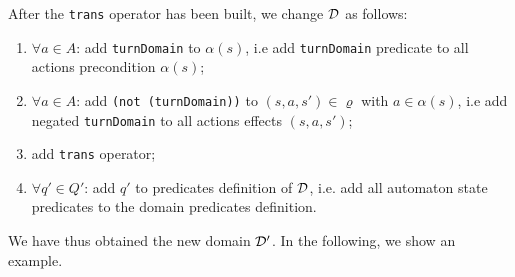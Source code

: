 After the \texttt{trans} operator has been built, we change $\mathcal{D}$ as follows:
\begin{enumerate}
\item $\forall a \in A$: add \texttt{turnDomain} to $\alpha(s)$, i.e add \texttt{turnDomain} predicate to all actions precondition $\alpha(s)$;
\item $\forall a \in A$: add \texttt{(not (turnDomain))} to $(s,a,s') \in \varrho$ with $a \in \alpha(s)$, i.e add negated \texttt{turnDomain} to all actions effects $(s,a,s')$;
\item add \texttt{trans} operator;
\item $\forall q' \in Q'$: add $q'$ to predicates definition of $\mathcal{D}$, i.e. add all automaton state predicates to the domain predicates definition.
\end{enumerate}

\noindent We have thus obtained the new domain $\mathcal{D}'$. In the following, we show an example.

